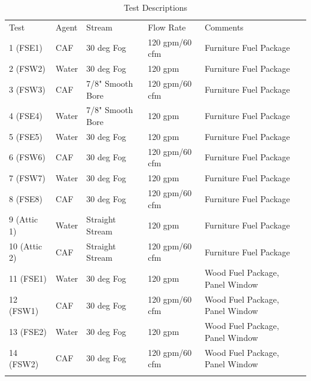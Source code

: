 \documentclass[12pt,oneside]{book}
\begin{document}
\begin{table}
	\centering
	\caption{Test Descriptions}
	\begin{tabular}{lllll}
		\hline\noalign{\smallskip}
		Test		& Agent		& Stream				& Flow Rate			& Comments \\
		\noalign{\smallskip}\hline\noalign{\smallskip}
		1 (FSE1)    &  CAF      &  30 deg Fog  			&  120 gpm/60 cfm   &	Furniture Fuel Package  \\
		2 (FSW2)   	& Water     &  30 deg Fog  			&  120 gpm    		&	Furniture Fuel Package	\\
		3 (FSW3) 	&  CAF      &  7/8" Smooth Bore  	&  120 gpm/60 cfm   &	Furniture Fuel Package  \\
		4 (FSE4)    &  Water    &  7/8" Smooth Bore  	&  120 gpm    		&	Furniture Fuel Package	\\
		5 (FSE5)    &  Water    &  30 deg Fog  			&  120 gpm    		&	Furniture Fuel Package	\\
		6 (FSW6)    &  CAF      &  30 deg Fog  			&  120 gpm/60 cfm   &	Furniture Fuel Package  \\
		7 (FSW7)    &  Water    &  30 deg Fog  			&  120 gpm    		&	Furniture Fuel Package	\\
		8 (FSE8)    &  CAF      &  30 deg Fog  			&  120 gpm/60 cfm   &	Furniture Fuel Package  \\
		9 (Attic 1) &  Water    &  Straight Stream  	&  120 gpm    		&	Furniture Fuel Package	\\
		10 (Attic 2)&  CAF      &  Straight Stream  	&  120 gpm/60 cfm   &	Furniture Fuel Package  \\
		11 (FSE1)   &  Water    &  30 deg Fog  			&  120 gpm   		&	Wood Fuel Package, Panel Window	 \\
		12 (FSW1)   &  CAF      &  30 deg Fog  			&  120 gpm/60 cfm   &	Wood Fuel Package, Panel Window  \\
		13 (FSE2)   &  Water    &  30 deg Fog  			&  120 gpm    		&	Wood Fuel Package, Panel Window  \\
		14 (FSW2)   &  CAF      &  30 deg Fog  			&  120 gpm/60 cfm   &	Wood Fuel Package, Panel Window  \\
		\noalign{\smallskip}\hline
	\end{tabular}
	\label{tab:Test_Descriptions}
\end{table}
\end{document}
